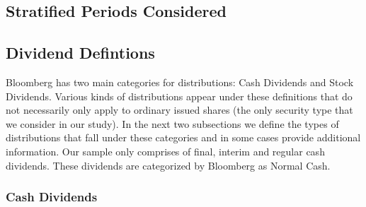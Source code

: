 \documentclass[10pt,preprint, authoryear]{elsarticle}
\numberwithin{equation}{section}
\numberwithin{figure}{section}
\numberwithin{table}{section}
\begin{document}
\hypertarget{stratified-periods-considered}{%
\subsection*{Stratified Periods
Considered}\label{stratified-periods-considered}}

\newpage

\hypertarget{dividend-defintions}{%
\subsection*{Dividend Defintions}\label{dividend-defintions}}

Bloomberg has two main categories for distributions: Cash Dividends and
Stock Dividends. Various kinds of distributions appear under these
definitions that do not necessarily only apply to ordinary issued shares
(the only security type that we consider in our study). In the next two
subsections we define the types of distributions that fall under these
categories and in some cases provide additional information. Our sample
only comprises of final, interim and regular cash dividends. These
dividends are categorized by Bloomberg as Normal Cash.

\hypertarget{cash-dividends}{%
\subsubsection*{Cash Dividends}\label{cash-dividends}}
\end{document}
